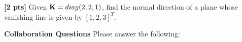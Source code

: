 \documentclass[11pt,addpoints,answers]{exam}
\numberwithin{equation}{section} %
\numberwithin{figure}{section} %
\numberwithin{table}{section} %
\begin{document}
\begin{questions}
\begin{tcolorbox}[fit,height=5cm, width=\textwidth, blank, borderline={0.5pt}{-2pt},halign=left, valign=center, nobeforeafter]


\end{tcolorbox}

\question \textbf{[2 pts]} Given $\mathbf{K}=diag(2,2,1)$, find the normal direction of a plane whose vanishing line is given by $[1,2,3]^T$.

\begin{tcolorbox}[fit,height=5cm, width=\textwidth, blank, borderline={0.5pt}{-2pt},halign=left, valign=center, nobeforeafter]


\end{tcolorbox}

\end{questions}

\clearpage

\textbf{Collaboration Questions} Please answer the following:
\end{document}
